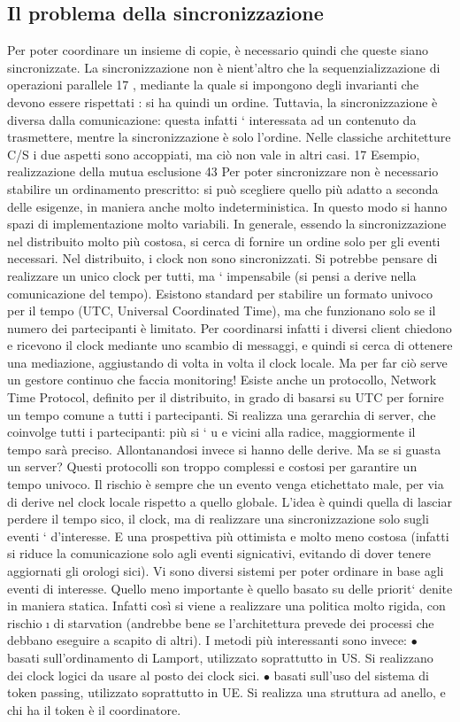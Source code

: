 \subsection{Il problema della sincronizzazione}
Per poter coordinare un insieme di copie, è necessario quindi che queste siano
sincronizzate. La sincronizzazione non è nient'altro che la sequenzializzazione
di operazioni parallele 17 , mediante la quale si impongono degli invarianti che
devono essere rispettati : si ha quindi un ordine.
Tuttavia, la sincronizzazione è diversa dalla comunicazione: questa infatti
` interessata ad un contenuto da trasmettere, mentre la sincronizzazione è solo
l'ordine. Nelle classiche architetture C/S i due aspetti sono accoppiati, ma ciò
non vale in altri casi.
17 Esempio,
realizzazione della mutua esclusione
43
Per poter sincronizzare non è necessario stabilire un ordinamento prescritto:
si può scegliere quello più adatto a seconda delle esigenze, in maniera anche
molto indeterministica. In questo modo si hanno spazi di implementazione
molto variabili. In generale, essendo la sincronizzazione nel distribuito molto
più costosa, si cerca di fornire un ordine solo per gli eventi necessari.
Nel distribuito, i clock non sono sincronizzati. Si potrebbe pensare di realizzare un unico clock per tutti, ma `
impensabile (si pensi a derive nella
comunicazione del tempo). Esistono standard per stabilire un formato univoco per il tempo (UTC, Universal Coordinated
Time), ma che funzionano solo
se il numero dei partecipanti è limitato. Per coordinarsi infatti i diversi client
chiedono e ricevono il clock mediante uno scambio di messaggi, e quindi si cerca
di ottenere una mediazione, aggiustando di volta in volta il clock locale. Ma per
far ciò serve un gestore continuo che faccia monitoring!
Esiste anche un protocollo, Network Time Protocol, definito per il distribuito,
in grado di basarsi su UTC per fornire un tempo comune a tutti i partecipanti.
Si realizza una gerarchia di server, che coinvolge tutti i partecipanti: più si `
u e
vicini alla radice, maggiormente il tempo sarà preciso. Allontanandosi invece si
hanno delle derive. Ma se si guasta un server?
Questi protocolli son troppo complessi e costosi per garantire un tempo univoco. Il rischio è sempre che un evento venga
etichettato male, per via di derive
nel clock locale rispetto a quello globale. L'idea è quindi quella di lasciar perdere
il tempo sico, il clock, ma di realizzare una sincronizzazione solo sugli eventi
`
d'interesse. E una prospettiva più ottimista e molto meno costosa (infatti si
riduce la comunicazione solo agli eventi signicativi, evitando di dover tenere
aggiornati gli orologi sici).
Vi sono diversi sistemi per poter ordinare in base agli eventi di interesse.
Quello meno importante è quello basato su delle priorit` denite in maniera
statica. Infatti così si viene a realizzare una politica molto rigida, con rischio
\i{}
di starvation (andrebbe bene se l'architettura prevede dei processi che debbano
eseguire a scapito di altri).
I metodi più interessanti sono invece:
$\bullet$ basati sull'ordinamento di Lamport, utilizzato soprattutto in US. Si realizzano dei clock logici da usare al
posto dei clock sici.
$\bullet$ basati sull'uso del sistema di token passing, utilizzato soprattutto in UE.
Si realizza una struttura ad anello, e chi ha il token è il coordinatore.
